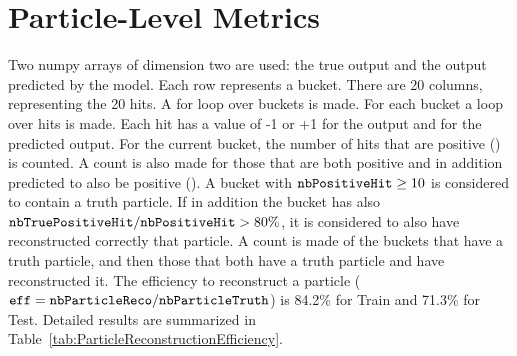 \section{Particle-Level Metrics}
\label{sec:ParticleLevelMetrics}

Two numpy arrays of dimension two are used: the true output and the output predicted by the model. Each row represents a bucket. There are 20 columns, representing the 20 hits. A for loop over buckets is made. For each bucket a loop over hits is made. Each hit has a value of -1 or +1 for the output and for the predicted output. For the current bucket, the number of hits that are positive (\nbPositiveHit) is counted. A count is also made for those that are both positive and in addition predicted to also be positive (\nbTruePositiveHit). A bucket with $\nbPositiveHit \ge10$ is considered to contain a truth particle. If in addition the bucket has also $\nbTruePositiveHit /\nbPositiveHit > 80\%$, it is considered to also have reconstructed correctly that particle. A count is made of the buckets that have a truth particle, and then those that both have a truth particle and have reconstructed it. The efficiency to reconstruct a particle ($\eff = \nbParticleReco / \nbParticleTruth$) is 84.2\% for Train and 71.3\% for Test. Detailed results are summarized in Table~\ref{tab:ParticleReconstructionEfficiency}.

\begin{table}[h!]
\centering
\caption {Particle reconstruction efficiency results.}
\label{tab:ParticleReconstructionEfficiency}
\end{table}
